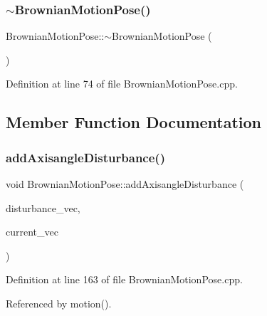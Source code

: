 \subsubsection{\texorpdfstring{$\sim$\+Brownian\+Motion\+Pose()}{~BrownianMotionPose()}}
{\footnotesize\ttfamily Brownian\+Motion\+Pose\+::$\sim$\+Brownian\+Motion\+Pose (\begin{DoxyParamCaption}{ }\end{DoxyParamCaption})\hspace{0.3cm}{\ttfamily [noexcept]}}



Definition at line 74 of file Brownian\+Motion\+Pose.\+cpp.



\subsection{Member Function Documentation}
\mbox{\label{classBrownianMotionPose_ad5da23c2e31dd9522115ae925a35e66e}} 
\subsubsection{\texorpdfstring{add\+Axisangle\+Disturbance()}{addAxisangleDisturbance()}}
{\footnotesize\ttfamily void Brownian\+Motion\+Pose\+::add\+Axisangle\+Disturbance (\begin{DoxyParamCaption}\item[{const Eigen\+::\+Ref$<$ const Eigen\+::\+Matrix\+Xf $>$ \&}]{disturbance\+\_\+vec,  }\item[{Eigen\+::\+Ref$<$ Eigen\+::\+Matrix\+Xf $>$}]{current\+\_\+vec }\end{DoxyParamCaption})\hspace{0.3cm}{\ttfamily [protected]}}



Definition at line 163 of file Brownian\+Motion\+Pose.\+cpp.



Referenced by motion().

\mbox{\label{classBrownianMotionPose_a9b008d4c1b94154a9997454d74eaef88}} 

